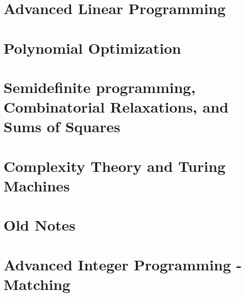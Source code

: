 
\section{Advanced Linear Programming}

\section{Polynomial Optimization}

\section{Semidefinite programming, Combinatorial Relaxations, and Sums of Squares}


\section{Complexity Theory and Turing Machines}


\section{Old Notes}





\section{Advanced Integer Programming - Matching}


